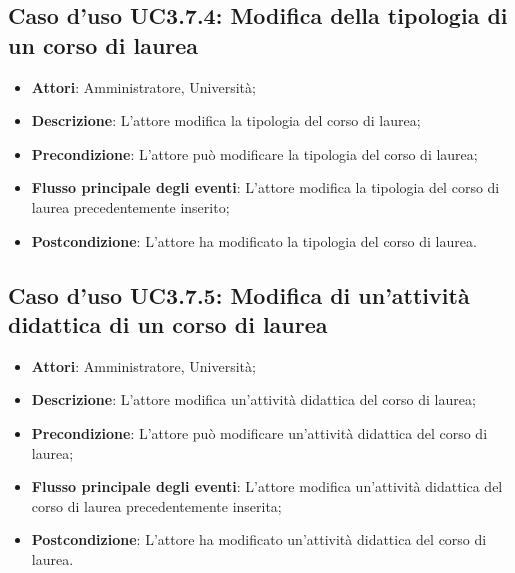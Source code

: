 \subsection{Caso d'uso \texorpdfstring{UC3.7.4}{UC3.7.4}: Modifica della tipologia di un corso di laurea}
\begin{itemize}
\item \textbf{Attori}: Amministratore, Università;
\item \textbf{Descrizione}: L'attore modifica la tipologia del corso di laurea;

\item \textbf{Precondizione}: L'attore può modificare la tipologia del corso di laurea;

\item \textbf{Flusso principale degli eventi}: L'attore modifica la tipologia del corso di laurea precedentemente inserito;

\item \textbf{Postcondizione}: L'attore ha modificato la tipologia del corso di laurea.

\end{itemize}
\subsection{Caso d'uso \texorpdfstring{UC3.7.5}{UC3.7.5}: Modifica di un'attività didattica di un corso di laurea}
\begin{itemize}
\item \textbf{Attori}: Amministratore, Università;
\item \textbf{Descrizione}: L'attore modifica un'attività didattica del corso di laurea;

\item \textbf{Precondizione}: L'attore può modificare un'attività didattica del corso di laurea;

\item \textbf{Flusso principale degli eventi}: L'attore modifica un'attività didattica del corso di laurea precedentemente inserita;

\item \textbf{Postcondizione}: L'attore ha modificato un'attività didattica del corso di laurea.

\end{itemize}
